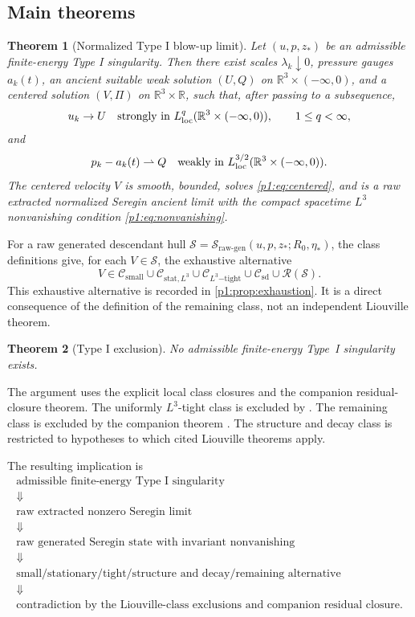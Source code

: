 \documentclass[11pt]{amsart}
\theoremstyle{plain}
\newtheorem{theorem}{Theorem}[section]
\theoremstyle{definition}
\theoremstyle{remark}
\numberwithin{equation}{section}
\newcommand{\R}{\mathbb R}
\newcommand{\loc}{\mathrm{loc}}
\newcommand{\calS}{\mathcal S}
\newcommand{\calR}{\mathcal R}
\newcommand{\calC}{\mathcal C}
\begin{document}
\subsection{Main theorems}

\begin{theorem}[Normalized Type I blow-up limit]\label{p1:thm:extraction}
Let \((u,p,z_*)\) be an admissible finite-energy Type I singularity.  Then
there exist scales \(\lambda_k\downarrow0\), pressure gauges \(a_k(t)\), an
ancient suitable weak solution \((U,Q)\) on
\(\R^3\times(-\infty,0)\), and a centered solution \((V,\Pi)\) on
\(\R^3\times\R\), such that, after passing to a subsequence,
\[
   u_k\to U
   \quad\hbox{strongly in }L^q_{\loc}(\R^3\times(-\infty,0)),
   \qquad 1\le q<\infty,
\]
and
\[
   p_k-a_k(t)\rightharpoonup Q
   \quad\hbox{weakly in }L^{3/2}_{\loc}(\R^3\times(-\infty,0)).
\]
The centered velocity \(V\) is smooth, bounded, solves \eqref{p1:eq:centered},
and is a raw extracted normalized Seregin ancient limit with the compact
spacetime \(L^3\) nonvanishing condition \eqref{p1:eq:nonvanishing}.
\end{theorem}

For a raw generated descendant hull
\(\calS=\calS_{\mathrm{raw\text{-}gen}}(u,p,z_*;R_0,\eta_*)\), the class definitions give, for
each \(V\in\calS\), the exhaustive alternative
\[
   V\in
   \calC_{\mathrm{small}}
   \cup
   \calC_{\mathrm{stat},L^3}
   \cup
   \calC_{L^3\mathrm{-tight}}
   \cup
   \calC_{\mathrm{sd}}
   \cup
   \calR(\calS).
\]
This exhaustive alternative is recorded in \cref{p1:prop:exhaustion}.  It is a
direct consequence of the definition of the remaining class, not an
independent Liouville theorem.

\begin{theorem}[Type I exclusion]
\label{p1:thm:remaining-criterion}
No admissible finite-energy Type~I singularity exists.
\end{theorem}

The argument uses the explicit local class closures and the companion
residual-closure theorem.  The uniformly \(L^3\)-tight class is excluded by
.
The remaining class is excluded by the companion theorem
.  The structure and decay
class is restricted to hypotheses to which cited Liouville theorems apply.

The resulting implication is
\[
\begin{array}{c}
\text{admissible finite-energy Type I singularity}
\\
\Downarrow
\\
\text{raw extracted nonzero Seregin limit}
\\
\Downarrow
\\
\text{raw generated Seregin state with invariant nonvanishing}
\\
\Downarrow
\\
\text{small/stationary/tight/structure and decay/remaining alternative}
\\
\Downarrow
\\
\text{contradiction by the Liouville-class exclusions and companion residual closure.}
\end{array}
\]
\end{document}
